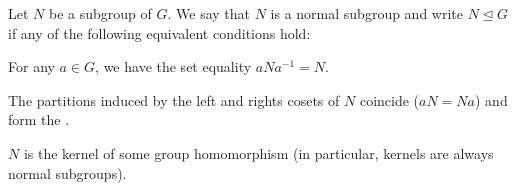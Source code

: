 \begin{definition}\label{def:normal_subgroup}
  Let \( N \) be a subgroup of \( G \). We say that \( N \) is a normal subgroup and write \( N \unlhd G \) if any of the following equivalent conditions hold:
  \begin{defenum}
    \item\label{def:normal_subgroup/direct} For any \( a \in G \), we have the set equality \( a N a^{-1} = N \).
    \item\label{def:normal_subgroup/cosets} The partitions induced by the left and rights cosets of \( N \) coincide (\( aN = Na \)) and form the .
    \item\label{def:normal_subgroup/kernel} \( N \) is the kernel of some group homomorphism (in particular, kernels are always normal subgroups).
  \end{defenum}
\end{definition}
